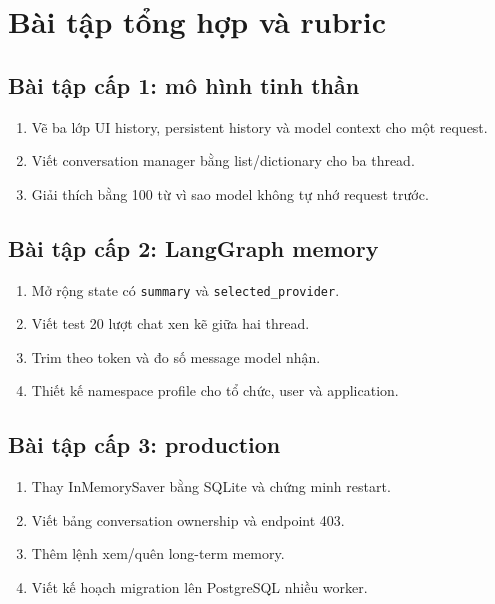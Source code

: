 \chapter{Bài tập tổng hợp và rubric}
\label{app:exercises-rubric}

\section{Bài tập cấp 1: mô hình tinh thần}

\begin{enumerate}
  \item Vẽ ba lớp UI history, persistent history và model context cho một request.
  \item Viết conversation manager bằng list/dictionary cho ba thread.
  \item Giải thích bằng 100 từ vì sao model không tự nhớ request trước.
\end{enumerate}

\section{Bài tập cấp 2: LangGraph memory}

\begin{enumerate}[resume]
  \item Mở rộng state có \texttt{summary} và \texttt{selected\_provider}.
  \item Viết test 20 lượt chat xen kẽ giữa hai thread.
  \item Trim theo token và đo số message model nhận.
  \item Thiết kế namespace profile cho tổ chức, user và application.
\end{enumerate}

\section{Bài tập cấp 3: production}

\begin{enumerate}[resume]
  \item Thay InMemorySaver bằng SQLite và chứng minh restart.
  \item Viết bảng conversation ownership và endpoint 403.
  \item Thêm lệnh xem/quên long-term memory.
  \item Viết kế hoạch migration lên PostgreSQL nhiều worker.
\end{enumerate}

